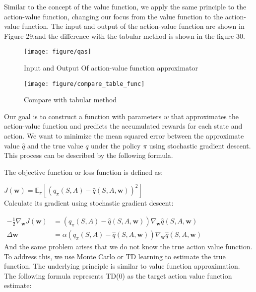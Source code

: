 \documentclass{article}
\begin{document}
Similar to the concept of the value function, we apply the same principle to the action-value function, changing our focus from the value function to the action-value function. The input and output of the action-value function are shown in Figure 29,and the difference with the tabular method is shown in the figure 30.

\begin{figure}[htbp]
        \centering
        \texttt{[image: figure/qas]}
        \caption{Input and Output Of action-value function approximator}
\end{figure}

\begin{figure}[htbp]
        \centering
        \texttt{[image: figure/compare\_table\_func]}
        \caption{Compare with tabular method}
\end{figure}


Our goal is to construct a function with parameters $w$ that approximates the action-value function and predicts the accumulated rewards for each state and action. We want to minimize the mean squared error between the approximate value $\hat{q}$ and the true value $q$ under the policy $\pi$ using stochastic gradient descent. This process can be described by the following formula.

The objective function or loss function is defined as:

\hspace*{\fill}

$J(\mathbf{w})=\mathbb{E}_\pi\left[\left(q_\pi(S, A)-\hat{q}(S, A, \mathbf{w})\right)^2\right]$\\

Calculate its gradient using stochastic gradient descent:

\hspace*{\fill}

$\begin{aligned}-\frac{1}{2} \nabla_{\mathbf{w}} J(\mathbf{w}) & =\left(q_\pi(S, A)-\hat{q}(S, A, \mathbf{w})\right) \nabla_{\mathbf{w}} \hat{q}(S, A, \mathbf{w}) \\ \Delta \mathbf{w} & =\alpha\left(q_\pi(S, A)-\hat{q}(S, A, \mathbf{w})\right) \nabla_{\mathbf{w}} \hat{q}(S, A, \mathbf{w})\end{aligned}$\\

And the same problem arises that we do not know the true action value function. To address this, we use Monte Carlo or TD learning to estimate the true function. The underlying principle is similar to value function approximation. The following formula represents TD(0) as the target action value function estimate:
\end{document}
